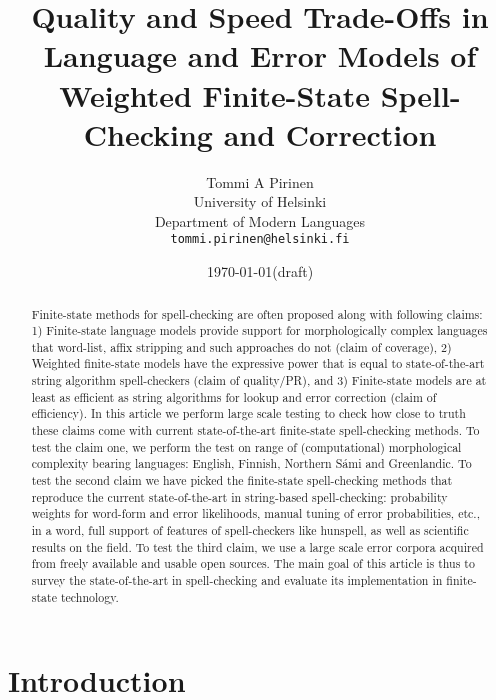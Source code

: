 \documentclass[a4paper,12pt]{article}
\title{Quality and Speed Trade-Offs in
    Language and Error Models of
    Weighted Finite-State Spell-Checking and Correction}
\author{Tommi A Pirinen\\
 [0.5cm] University of Helsinki\\ %
 Department of Modern Languages\\ %
 \texttt{tommi.pirinen@helsinki.fi}}   %
\date{\today (draft)}
\begin{document}
\ifpdf
{}
\fi

\maketitle 
\thispagestyle{empty}

\begin{abstract}
\noindent 
Finite-state methods for spell-checking are often proposed along with following
claims: 1) Finite-state language models provide support for morphologically
complex languages that word-list, affix stripping and such approaches do not
(claim of coverage), 2) Weighted finite-state models have the expressive power
that is equal to state-of-the-art string algorithm spell-checkers (claim of
quality/PR), and 3) Finite-state models are at least as efficient as string
algorithms for lookup and error correction (claim of efficiency).  In this
article we perform large scale testing to check how close to truth these claims
come with current state-of-the-art finite-state spell-checking methods. To test
the claim one, we perform the test on range of (computational) morphological
complexity bearing languages: English, Finnish, Northern Sámi and Greenlandic.
To test the second claim we have picked the finite-state spell-checking methods
that reproduce the current state-of-the-art in string-based spell-checking:
probability weights for word-form and error likelihoods, manual tuning of error
probabilities, etc., in a word, full support of features of spell-checkers like
hunspell, as well as scientific results on the field. To test the third claim,
we use a large scale error corpora acquired from freely available and usable
open sources. The main goal of this article is thus to survey the
state-of-the-art in spell-checking and evaluate its implementation in
finite-state technology.
\end{abstract}


\makeatletter\let\chapter\@undefined\makeatother
\listoftodos

\section{Introduction} 
\end{document}
